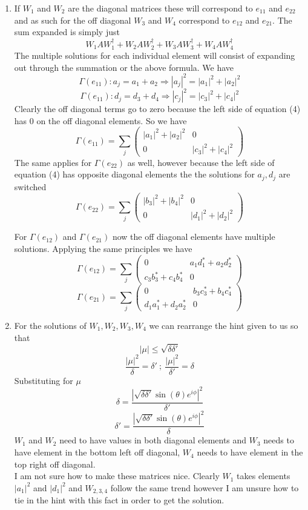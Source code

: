 \documentclass[12pt]{article}
\begin{document}
\begin{enumerate}
\begin{enumerate}
    \item If $W_1$ and $W_2$ are the diagonal matrices these will correspond to $e_{11}$ and $e_{22}$ and as such for the off diagonal $W_3$ and $W_4$ correspond to $e_{12}$ and $e_{21}$. The sum expanded is simply just 
    $$ W_1 A W_1^{\dagger} + W_2 A W_2^{\dagger} + W_3 A W_3^{\dagger} + W_4 A W_4^{\dagger} $$
    The multiple solutions for each individual element will consist of expanding out through the summation or the above formula. We have 
    $$ \Gamma (e_{11}): a_j = a_1 + a_2 \Rightarrow |a_j|^2 = |a_1|^2 + |a_2|^2 $$
    $$ \Gamma (e_{11}): d_j = d_3 + d_4 \Rightarrow |c_j|^2 = |c_3|^2 + |c_4|^2 $$ 
    Clearly the off diagonal terms go to zero because the left side of equation (4) has 0 on the off diagonal elements. So we have 
    $$ \Gamma (e_{11}) = \sum_j \begin{pmatrix}
            |a_1|^2 + |a_2|^2 &0\\ 0& |c_3|^2+|c_4|^2 
              \end{pmatrix} $$ 
    The same applies for $\Gamma (e_{22})$ as well, however because the left side of equation (4) has opposite diagonal elements the the solutions for $a_j, d_j$ are switched
    $$ \Gamma(e_{22}) = \sum_j \begin{pmatrix}
            |b_3|^2 + |b_4|^2 &0\\ 0& |d_1|^2 + |d_2|^2  
              \end{pmatrix} $$ 
    
    For $\Gamma (e_{12})$ and $\Gamma (e_{21})$ now the off diagonal elements have multiple solutions. Applying the same principles we have 
    $$ \Gamma(e_{12}) = \sum_j \begin{pmatrix}
            0&a_1 d_1^* + a_2 d_2^*\\ c_3 b_3^* + c_4 b_4^*&0 
              \end{pmatrix} $$ 
    $$ \Gamma(e_{21})= \sum_j \begin{pmatrix}
            0&b_3 c_3^*+ b_4 c_4^*\\ d_1 a_1^*+ d_2 a_2^*&0
                \end{pmatrix} $$ 

    \item For the solutions of $W_1, W_2, W_3, W_4$ we can rearrange the hint given to us so that 
    $$ |\mu| \leq \sqrt{\delta \delta'} $$
    $$ \frac{|\mu|^2}{\delta} = \delta' \ ; \ \frac{|\mu|^2}{\delta'} = \delta $$
    Substituting for $\mu$ 
    $$ \delta = \frac{|\sqrt{\delta \delta'} \sin(\theta) e^{i \phi}|^2}{\delta'} $$
    $$ \delta' = \frac{|\sqrt{\delta \delta'} \sin(\theta) e^{i \phi}|^2}{\delta} $$
    $W_1$ and $W_2$ need to have values in both diagonal elements and $W_3$ needs to have element in the bottom left off diagonal, $W_4$ needs to have element in the top right off diagonal. 
    \\
    I am not sure how to make these matrices nice. Clearly $W_1$ takes elements $|a_1|^2$ and $|d_1|^2$ and $W_{2,3,4}$ follow the same trend however I am unsure how to tie in the hint with this fact in order to get the solution. 
    \end{enumerate}
\end{enumerate}
\end{document}
